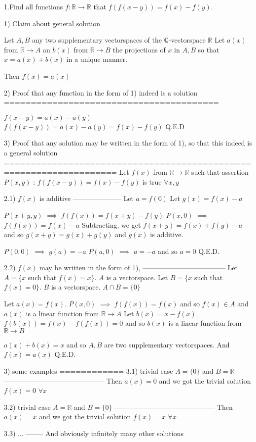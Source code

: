 \begin{solution}
	\begin{tcolorbox}1.Find all functions $f:\mathbb{R} \rightarrow \mathbb{R} $ that 
$f(f(x-y))=f(x)-f(y)$.\end{tcolorbox}
1) Claim about general solution
====================

Let $A,B$ any two supplementary vectorspaces of the $\mathbb Q$-vectorspace $\mathbb R$
Let $a(x)$ from $\mathbb R\to A$ an $b(x)$ from $\mathbb R\to B$ the projections of $x$ in $A,B$ so that $x=a(x)+b(x)$ in a unique manner.

Then $f(x)=a(x)$

2) Proof that any function in the form of 1) indeed is a solution
========================================

$f(x-y)=a(x)-a(y)$
$f(f(x-y))=a(x)-a(y)=f(x)-f(y)$
Q.E.D

3) Proof that any solution may be written in the form of 1), so that this indeed is a general solution
===================================================================
Let $f(x)$ from $\mathbb R\to\mathbb R$ such that assertion $P(x,y)$ : $f(f(x-y))=f(x)-f(y)$ is true $\forall x,y$

2.1) $f(x)$ is additive
---------------------
Let $a=f(0)$
Let $g(x)=f(x)-a$

$P(x+y,y)$ $\implies$ $f(f(x))=f(x+y)-f(y)$
$P(x,0)$ $\implies$ $f(f(x))=f(x)-a$
Subtracting, we get $f(x+y)=f(x)+f(y)-a$ and so $g(x+y)=g(x)+g(y)$ and $g(x)$ is additive.

$P(0,0)$ $\implies$ $g(a)=-a$
$P(a,0)$ $\implies$ $a=-a$ and so $a=0$
Q.E.D.

2.2) $f(x)$ may be written in the form of 1),
------------------------------------
Let $A=\{x$ such that $f(x)=x\}$. $A$ is a vectorspace.
Let $B=\{x$ such that $f(x)=0\}$. $B$ is a vectorspace.
$A\cap B=\{0\}$

Let $a(x)=f(x)$. $P(x,0)$ $\implies$ $f(f(x))=f(x)$ and so $f(x)\in A$ and $a(x)$ is a linear function from $\mathbb R\to A$
Let $b(x)=x-f(x)$. $f(b(x))=f(x)-f(f(x))=0$ and so $b(x)$ is a linear function from $\mathbb R\to B$

$a(x)+b(x)=x$  and so $A,B$ are two supplementary vectorspaces.
And $f(x)=a(x)$
Q.E.D.

3) some examples
============
3.1) trivial case $A=\{0\}$ and $B=\mathbb R$
--------------------------------------------
Then $a(x)=0$ and we got the trivial solution $f(x)=0$ $\forall x$

3.2) trivial case $A=\mathbb R$ and $B=\{0\}$ 
--------------------------------------------
Then $a(x)=x$ and we got the trivial solution $f(x)=x$ $\forall x$

3.3) ...
--------
And obviously infinitely many other solutions
\end{solution}



